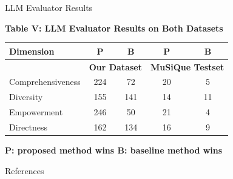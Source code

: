 \documentclass[aspectratio=169,xcolor=dvipsnames]{beamer}
\begin{document}
	\begin{frame}{LLM Evaluator Results}
		
		\scriptsize
		\centering
		
		{\textbf{\textcolor{blue!70}{Table V: LLM Evaluator Results on Both Datasets}}}
		
		\vspace{0.2cm}
		
		\begin{tabular}{|l|c|c|c|c|}
			\hline
			\textbf{\textcolor{purple!80}{Dimension}} &
			\textbf{\textcolor{teal!80}{P}} &
			\textbf{\textcolor{gray!80}{B}} &
			\textbf{\textcolor{teal!80}{P}} &
			\textbf{\textcolor{gray!80}{B}} \\
			\hline
			& \multicolumn{2}{c|}{\textbf{\textcolor{blue!60}{Our Dataset}}} &
			\multicolumn{2}{c|}{\textbf{\textcolor{blue!60}{MuSiQue Testset}}} \\
			\hline
			Comprehensiveness & \textcolor{teal!80}{224} & 72 & \textcolor{teal!80}{20} & 5 \\
			Diversity          & 155 & 141 & 14 & 11 \\
			Empowerment        & \textcolor{teal!80}{246} & 50 & \textcolor{teal!80}{21} & 4 \\
			Directness         & \textcolor{teal!80}{162} & 134 & \textcolor{teal!80}{16} & 9 \\
			\hline
		\end{tabular}
		
		\vspace{0.25cm}
		
		{\textbf{\textcolor{gray!80}{\scriptsize
					P: proposed method wins \quad
					B: baseline method wins
		}}}
		
	\end{frame}
	
	\begin{frame}{References}
		
		
	\end{frame}
	
\end{document}
